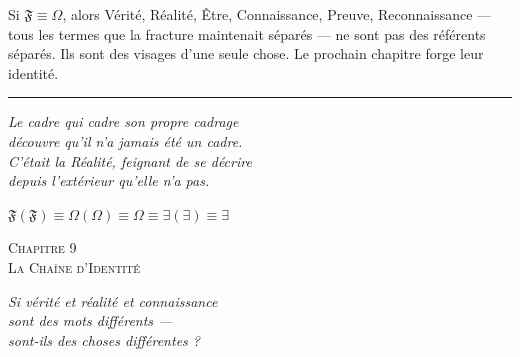 \documentclass[10pt, openany, oneside]{book}
\renewcommand{\large}{\fontsize{11.5}{14}\selectfont}
\renewcommand{\huge}{\fontsize{17}{21}\selectfont}
\begin{document}
Si $\mathfrak{F} \equiv \Omega$, alors Vérité, Réalité, Être, Connaissance, Preuve, Reconnaissance --- tous les termes que la fracture maintenait séparés --- ne sont pas des référents séparés. Ils sont des visages d'une seule chose. Le prochain chapitre forge leur identité.

\vspace{2em}

\begin{center}
    \rule{0.15\textwidth}{0.3pt}
\end{center}

\vspace{0.5em}

\begin{center}
    \itshape
    Le cadre qui cadre son propre cadrage\\
    découvre qu'il n'a jamais été un cadre.\\[0.8em]
    C'était la Réalité, feignant de se décrire\\
    depuis l'extérieur qu'elle n'a pas.
\end{center}

\vspace{0.5em}

\begin{center}
    $\mathfrak{F}(\mathfrak{F}) \equiv \Omega(\Omega) \equiv \Omega \equiv \exists(\exists) \equiv \exists$
\end{center}

%
%
%
%

\newpage

\begin{center}
    {\huge\scshape Chapitre 9}\\[0.3em]
    {\large\scshape La Chaîne d'Identité}
\end{center}

\vspace{1.5em}

\begin{center}
    \itshape
    Si vérité et réalité et connaissance\\
    sont des mots différents ---\\
    sont-ils des choses différentes ?
\end{center}
\end{document}
